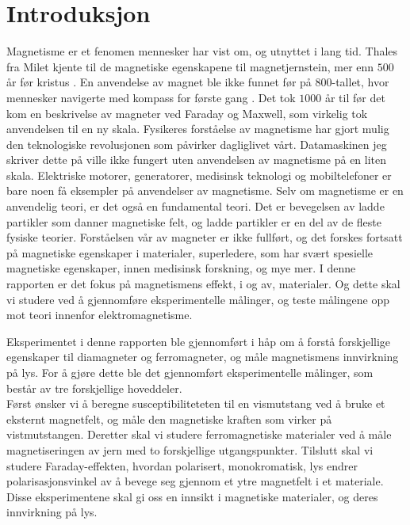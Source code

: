 \documentclass[%
 reprint,
 amsmath,amssymb,
 aps,
 norsk,
]{revtex4-1}
\begin{document}

\section{Introduksjon}
Magnetisme er et fenomen mennesker har vist om, og utnyttet i lang tid. Thales fra Milet kjente til de magnetiske egenskapene til magnetjernstein, mer enn $500$ år før kristus \cite{holtebekk_magnetisme_2017}. En anvendelse av magnet ble ikke funnet før på $800$-tallet, hvor mennesker navigerte med kompass for første gang \cite{holtebekk_magnetisme_2017}. Det tok $1000$ år til før det kom en beskrivelse av magneter ved Faraday og Maxwell, som virkelig tok anvendelsen til en ny skala. Fysikeres forståelse av magnetisme har gjort mulig den teknologiske revolusjonen som påvirker dagliglivet vårt. Datamaskinen jeg skriver dette på ville ikke fungert uten anvendelsen av magnetisme på en liten skala. Elektriske motorer, generatorer, medisinsk teknologi og mobiltelefoner er bare noen få eksempler på anvendelser av magnetisme. Selv om magnetisme er en anvendelig teori, er det også en fundamental teori. Det er bevegelsen av ladde partikler som danner magnetiske felt, og ladde partikler er en del av de fleste fysiske teorier. Forståelsen vår av magneter er ikke fullført, og det forskes fortsatt på magnetiske egenskaper i materialer, superledere, som har svært spesielle magnetiske egenskaper, innen medisinsk forskning, og mye mer.
I denne rapporten er det fokus på magnetismens effekt, i og av, materialer. Og dette skal vi studere ved å gjennomføre eksperimentelle målinger, og teste målingene opp mot teori innenfor elektromagnetisme.\par
Eksperimentet i denne rapporten ble gjennomført i håp om å forstå forskjellige egenskaper til diamagneter og ferromagneter, og måle magnetismens innvirkning på lys. For å gjøre dette ble det gjennomført eksperimentelle målinger, som består av tre forskjellige hoveddeler.\\
Først ønsker vi å beregne susceptibiliteteten til en vismutstang ved å bruke et eksternt magnetfelt, og måle den magnetiske kraften som virker på vistmutstangen. Deretter skal vi studere ferromagnetiske materialer ved å måle magnetiseringen av jern med to forskjellige utgangspunkter. Tilslutt skal vi studere Faraday-effekten, hvordan polarisert, monokromatisk, lys endrer polarisasjonsvinkel av å bevege seg gjennom et ytre magnetfelt i et materiale. Disse eksperimentene skal gi oss en innsikt i magnetiske materialer, og deres innvirkning på lys.
\end{document}
